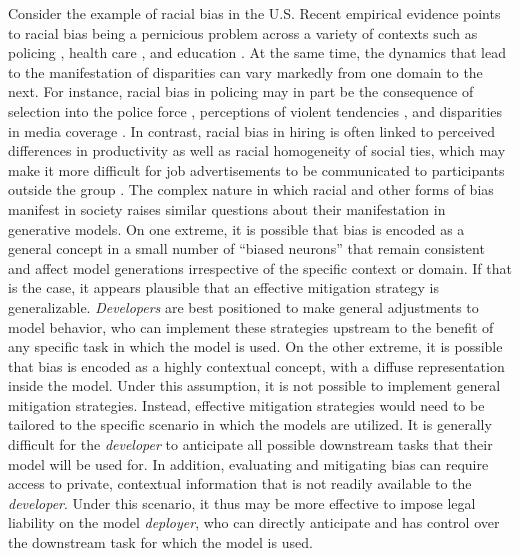 Consider the example of racial bias in the U.S. Recent empirical evidence points to racial bias being a pernicious problem across a variety of contexts such as policing \cite{pierson2020large}, health care \cite{pregnancy_bias}, and education \cite{pnasSchool}. At the same time, the dynamics that lead to the manifestation of disparities can vary markedly from one domain to the next. For instance, racial bias in policing may in part be the consequence of selection into the police force \cite{racist_cops}, perceptions of violent tendencies \cite{perception_violent, tv_perception}, and disparities in media coverage \cite{facebook_nyarko, suspects_black}. In contrast, racial bias in hiring is often linked to perceived differences in productivity \cite{kirshenman2019we} as well as racial homogeneity of social ties, which may make it more difficult for job advertisements to be communicated to participants outside the group \cite{job_network}. 
The complex nature in which racial and other forms of bias manifest in society raises similar questions about their manifestation in generative models. On one extreme, it is possible that bias is encoded as a general concept in a small number of ``biased neurons'' that remain consistent and affect model generations irrespective of the specific context or domain. If that is the case, it appears plausible that an effective mitigation strategy is generalizable. \textit{Developers} are best positioned to make general adjustments to model behavior, who can implement these strategies upstream to the benefit of any specific task in which the model is used. On the other extreme, it is possible that bias is encoded as a highly contextual concept, with a diffuse representation inside the model. Under this assumption, it is not possible to implement general mitigation strategies. Instead, effective mitigation strategies would need to be tailored to the specific scenario in which the models are utilized. It is generally difficult for the \textit{developer} to anticipate all possible downstream tasks that their model will be used for. In addition, evaluating and mitigating bias can require access to private, contextual information that is not readily available to the \textit{developer}. Under this scenario, it thus may be more effective to impose legal liability on the model \textit{deployer}, who can directly anticipate and has control over the downstream task for which the model is used.
